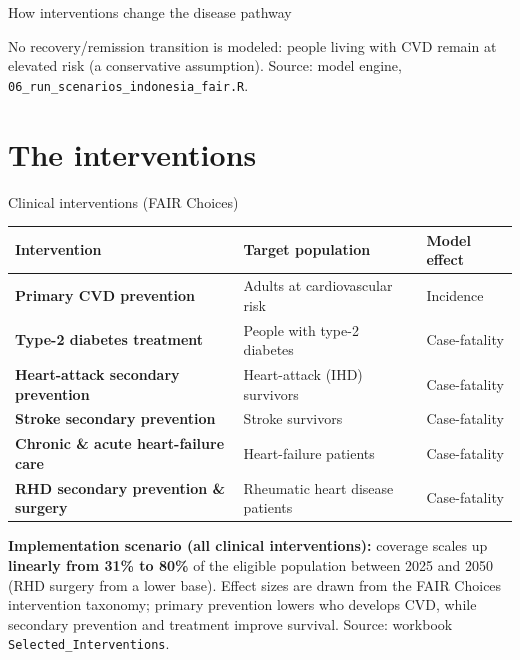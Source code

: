 \documentclass[
  ignorenonframetext,
  aspectratio=169]{beamer}
\begin{document}
\begin{frame}{How interventions change the disease pathway}
\vspace{3pt}

\scriptsize No recovery/remission transition is modeled: people living
with CVD remain at elevated risk (a conservative assumption). Source:
model engine, \texttt{06\_run\_scenarios\_indonesia\_fair.R}.
\end{frame}

\section{The interventions}\label{the-interventions}

\begin{frame}{Clinical interventions (FAIR Choices)}
\label{clinical-interventions-fair-choices}
\begin{table}[!h]
\centering\begingroup\fontsize{8.5}{10.5}\selectfont

\begin{tabular}[t]{>{\raggedright\arraybackslash}p{4.6cm}>{\raggedright\arraybackslash}p{6.4cm}>{\raggedright\arraybackslash}p{3.0cm}}
\toprule
\textbf{Intervention} & \textbf{Target population} & \textbf{Model effect}\\
\midrule
\textbf{Primary CVD prevention} & Adults at cardiovascular risk & \textcolor{incidencecol}{Incidence}\\
\textbf{Type-2 diabetes treatment} & People with type-2 diabetes & \textcolor{casefatalcol}{Case-fatality}\\
\textbf{Heart-attack secondary prevention} & Heart-attack (IHD) survivors & \textcolor{casefatalcol}{Case-fatality}\\
\textbf{Stroke secondary prevention} & Stroke survivors & \textcolor{casefatalcol}{Case-fatality}\\
\textbf{Chronic \& acute heart-failure care} & Heart-failure patients & \textcolor{casefatalcol}{Case-fatality}\\
\addlinespace
\textbf{RHD secondary prevention \& surgery} & Rheumatic heart disease patients & \textcolor{casefatalcol}{Case-fatality}\\
\bottomrule
\end{tabular}
\endgroup{}
\end{table}

\vspace{2pt}

\footnotesize \textbf{Implementation scenario (all clinical interventions):}
coverage scales up \textbf{linearly from 31\% to 80\%} of the eligible
population between 2025 and 2050 (RHD surgery from a lower base). Effect
sizes are drawn from the FAIR Choices intervention taxonomy; primary
prevention lowers who develops CVD, while secondary prevention and
treatment improve survival. \scriptsize Source: workbook
\texttt{Selected\_Interventions}.
\end{frame}
\end{document}
